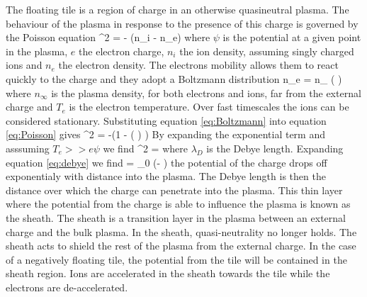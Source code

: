 The floating tile is a region of charge in an otherwise quasineutral plasma. The behaviour of the plasma in response to the presence of this charge is governed by the Poisson equation
\be
\nabla^2 \psi = - (n_i - n_e)
\label{eq:Poisson}
\ee 
where $\psi$ is the potential at a given point in the plasma, $e$ the electron charge, $n_i$ the ion density, assuming singly charged ions and $n_e$ the electron density. The electrons mobility allows them to react quickly to the charge and they adopt a Boltzmann distribution 
\be 
n_e = n_{\infty} \exp \left(  \right)
\label{eq:Boltzmann}
\ee
where $n_{\infty}$ is the plasma density, for both electrons and ions, far from the external charge and $T_e$ is the electron temperature. Over fast timescales the ions can be considered stationary. Substituting equation \ref{eq:Boltzmann} into equation \ref{eq:Poisson} gives 
\be 
\nabla^2 \psi = -\left(1 - \exp \left( \right) \right)
\ee
By expanding the exponential term and asssuming $T_e >> e \psi$ we find 
\be 
\nabla^2 \psi \approx {} \psi = 
\label{eq:debye}
\ee
where $\lambda_D$ is the Debye length. Expanding equation \ref{eq:debye} we find
\be 
\psi = \psi_0 \exp \left(- \right)
\ee 
the potential of the charge drops off exponentialy with distance into the plasma. The Debye length is then the distance over which the charge can penetrate into the plasma. This thin layer where the potential from the charge is able to influence the plasma is known as the sheath. The sheath is a transition layer in the plasma between an external charge and the bulk plasma. In the sheath, quasi-neutrality no longer holds. %
The sheath acts to shield the rest of the plasma from the external charge. In the case of a negatively floating tile, the potential from the tile will be contained in the sheath region. Ions are accelerated in the sheath towards the tile while the electrons are de-accelerated. %
